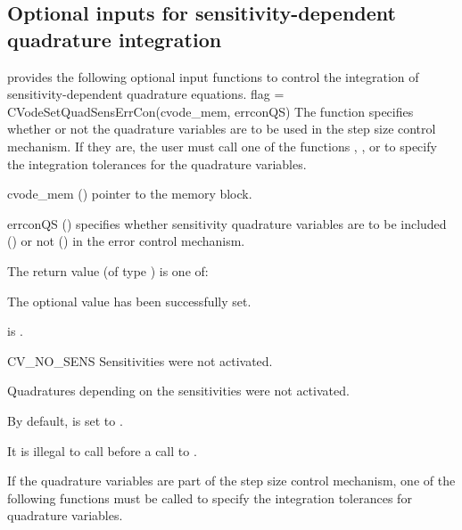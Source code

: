 \subsection{Optional inputs for sensitivity-dependent quadrature integration}
\label{ss:quad_sens_optional_input}
{\cvodes} provides the following optional input functions to control the integration
of sensitivity-dependent quadrature equations.
{
 flag = CVodeSetQuadSensErrCon(cvode\_mem, errconQS)
}
{
  The function  specifies whether or not the
  quadrature variables are to be used in the step size control
  mechanism. If they are, the user must call one of the functions
  , , or
   to specify the integration tolerances for
  the quadrature variables.  
}
{
  \begin{args}[errconQS]
  \item[cvode\_mem] ()
    pointer to the {\cvodes} memory block.
  \item[errconQS] ()
    specifies whether sensitivity quadrature variables are to be included
    () or not () in the error control mechanism. 
  \end{args}
}
{
  The return value  (of type ) is one of:
  \begin{args}[CV\_NO\_QUADSENS]
  \item[\Id{CV\_SUCCESS}] 
    The optional value has been successfully set.
  \item[\Id{CVODE\_MEM\_NULL}]
     is .
  \item[CV\_NO\_SENS]
    Sensitivities were not activated.
  \item[\Id{CV\_NO\_QUADSENS}] 
    Quadratures depending on the sensitivities were not activated.
  \end{args}
}
{
  By default,  is set to . 

  {\warn}It is illegal to call  before a call 
  to .
}


If the quadrature variables are part of the step size control mechanism, 
one of the following functions must be called to specify the
integration tolerances for quadrature variables. 

